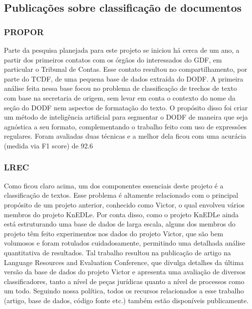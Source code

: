 \documentclass[12pt]{article}
\begin{document}
\subsection{Publicações sobre classificação de documentos}
\label{subsec:pub}

\subsubsection*{PROPOR}
Parte da pesquisa planejada para este projeto se iniciou há cerca de um ano, a partir dos primeiros contatos com os órgãos do interessados do GDF, em particular o Tribunal de Contas. Esse contato resultou no compartilhamento, por parte do TCDF, de uma pequena base de dados extraída do DODF. A primeira análise feita nessa base focou no problema de classificação de trechos de texto com base na secretaria de origem, sem levar em conta o contexto do nome da seção do DODF nem aspectos de formatação do texto. O propósito disso foi criar um método de inteligência artificial para segmentar o DODF de maneira que seja agnóstica a seu formato, complementando o trabalho feito com uso de expressões regulares. Foram avaliadas duas técnicas e a melhor dela ficou com uma acurácia (medida via F1 score) de 92.6%

\subsubsection*{LREC}

Como ficou claro acima, um dos componentes essenciais deste projeto é a classificação de textos. Esse problema é altamente relacionado com o principal propósito de um projeto anterior, conhecido como Victor, o qual envolveu vários membros do projeto KnEDLe. Por conta disso, como o projeto KnEDLe ainda está estruturando uma base de dados de larga escala, alguns dos membros do projeto têm feito experimentos nos dados do projeto Victor, que são bem volumosos e foram rotulados cuidadosamente, permitindo uma detalhada análise quantitativa de resultados. Tal trabalho resultou na publicação de artigo na Language Resources and Evaluation Conference, que divulga detalhes da última versão da base de dados do projeto Victor e apresenta uma avaliação de diversos classificadores, tanto a nível de peças jurídicas quanto a nível de processos como um todo. Seguindo nossa política, todos os recursos relacionados a esse trabalho (artigo, base de dados, código fonte etc.) também  estão disponíveis publicamente.
\end{document}

